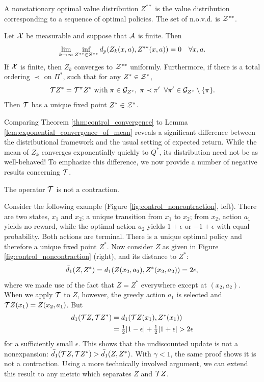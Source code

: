 \documentclass{article}
\begin{document}
\begin{defn}
A nonstationary optimal value distribution $Z^{**}$ is the value distribution corresponding to a sequence of optimal policies. The set of n.o.v.d. is $\mathcal{Z}^{**}$.
\end{defn}
\begin{thm}\label{thm:control_convergence}
Let $\mathcal{X}$ be measurable and suppose that $\mathcal{A}$ is finite. Then
\begin{equation*}
\lim_{k \to \infty} \inf_{Z^{**} \in \mathcal{Z}^{**}} d_p (Z_k(x,a), Z^{**}(x,a)) = 0 \quad \forall x, a .
\end{equation*}
If $\mathcal{X}$ is finite, then $Z_k$ converges to $\mathcal{Z}^{**}$ uniformly. Furthermore, if there is a total ordering $\prec$ on $\Pi^*$, such that for any $Z^* \in \mathcal{Z}^*$,
\begin{equation*}
\mathcal{T} Z^* = \mathcal{T}^\pi Z^* \; \text{with} \; \pi \in \mathcal{G}_{Z^*}, \; \pi \prec \pi' \; \; \forall \pi' \in \mathcal{G}_{Z^*} \setminus \{\pi \} .
\end{equation*}
Then $\mathcal{T}$ has a unique fixed point $Z^* \in \mathcal{Z}^*$.
\end{thm}
Comparing Theorem \ref{thm:control_convergence} to Lemma \ref{lem:exponential_convergence_of_mean} reveals a significant difference between the distributional framework and the usual setting of expected return. While the mean of $Z_k$ converges exponentially quickly to $Q^*$, its distribution need not be as well-behaved! To emphasize this difference, we now provide a number of negative results concerning $\mathcal{T}$.
\begin{prop}\label{prop:control_noncontraction}
The operator $\mathcal{T}$ is not a contraction.
\end{prop}
Consider the following example (Figure \ref{fig:control_noncontraction}, left). There are two states, $x_1$ and $x_2$; a unique transition from $x_1$ to $x_2$; from $x_2$, action $a_1$ yields no reward, while the optimal action $a_2$ yields $1 + \epsilon$ or $-1 + \epsilon$ with equal probability. Both actions are terminal. There is a unique optimal policy and therefore a unique fixed point $Z^*$. Now consider $Z$ as given in Figure \ref{fig:control_noncontraction} (right), and its distance to $Z^*$:
\begin{equation*}
\bar d_1(Z, Z^*) = d_1(Z(x_2, a_2), Z^*(x_2, a_2)) = 2 \epsilon , \\
\end{equation*}
where we made use of the fact that $Z = Z^*$ everywhere except at $(x_2, a_2)$. When we apply $\mathcal{T}$ to $Z$, however, the greedy action $a_1$ is selected and $\mathcal{T} Z(x_1) = Z(x_2, a_1)$. But
\begin{align*}
d_1(\cT Z, \cT Z^*) &= d_1(\cT Z(x_1), Z^*(x_1)) \\
&= \tfrac{1}{2} | 1 - \epsilon | + \tfrac{1}{2}  | 1 + \epsilon | > 2 \epsilon
%
%
\end{align*}
for a sufficiently small $\epsilon$. This shows that the undiscounted update is not a nonexpansion: $\bar d_1(\mathcal{T} Z, \mathcal{T} Z^*) > \bar d_1(Z, Z^*)$. With $\gamma < 1$, the same proof shows it is not a contraction. Using a more technically involved argument, we can extend this result to any metric which separates $Z$ and $\mathcal{T} Z$.
%
\end{document}
